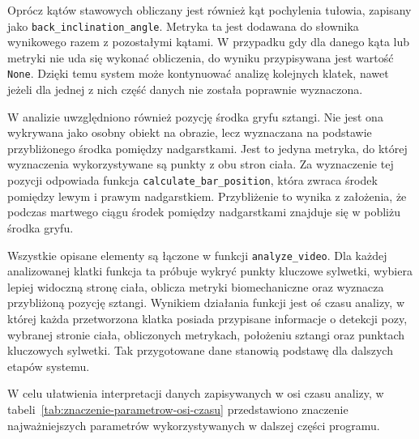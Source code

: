 Oprócz kątów stawowych obliczany jest również kąt pochylenia tułowia, zapisany jako \texttt{back\_inclination\_angle}. Metryka ta jest dodawana do słownika wynikowego razem z pozostałymi kątami. W przypadku gdy dla danego kąta lub metryki nie uda się wykonać obliczenia, do wyniku przypisywana jest wartość \texttt{None}. Dzięki temu system może kontynuować analizę kolejnych klatek, nawet jeżeli dla jednej z nich część danych nie została poprawnie wyznaczona.

W analizie uwzględniono również pozycję środka gryfu sztangi. Nie jest ona wykrywana jako osobny obiekt na obrazie, lecz wyznaczana na podstawie przybliżonego środka pomiędzy nadgarstkami. Jest to jedyna metryka, do której wyznaczenia wykorzystywane są punkty z obu stron ciała. Za wyznaczenie tej pozycji odpowiada funkcja \texttt{calculate\_bar\_position}, która zwraca środek pomiędzy lewym i prawym nadgarstkiem. Przybliżenie to wynika z założenia, że podczas martwego ciągu środek pomiędzy nadgarstkami znajduje się w pobliżu środka gryfu.

Wszystkie opisane elementy są łączone w funkcji \texttt{analyze\_video}. Dla każdej analizowanej klatki funkcja ta próbuje wykryć punkty kluczowe sylwetki, wybiera lepiej widoczną stronę ciała, oblicza metryki biomechaniczne oraz wyznacza przybliżoną pozycję sztangi. Wynikiem działania funkcji jest oś czasu analizy, w której każda przetworzona klatka posiada przypisane informacje o detekcji pozy, wybranej stronie ciała, obliczonych metrykach, położeniu sztangi oraz punktach kluczowych sylwetki. Tak przygotowane dane stanowią podstawę dla dalszych etapów systemu.

W celu ułatwienia interpretacji danych zapisywanych w osi czasu analizy, w tabeli~\ref{tab:znaczenie-parametrow-osi-czasu} przedstawiono znaczenie najważniejszych parametrów wykorzystywanych w dalszej części programu.

